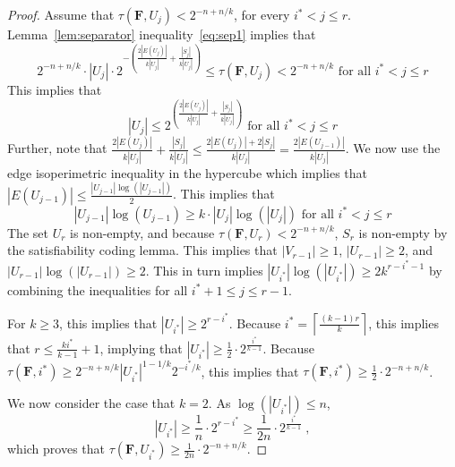 \documentclass[11pt, letterpaper]{article}
\theoremstyle{definition}
\newcommand{\f}{\mathbf{F}}
\newcommand{\ceil}[1]{{\left\lceil{#1}\right\rceil}}
\begin{document}
\begin{proof}
    \medskip\noindent
    Assume that $\tau(\f, U_j) < 2^{-n+n/k}$, for every $i^*<j \leq r$. Lemma~\ref{lem:separator} inequality~\ref{eq:sep1} implies that
    \begin{equation}
          2^{-n+n/k}\cdot |U_{j}| \cdot 2^{-\left(  \frac{2|E(U_{j})|}{k|U_{j}|}+\frac{|S_{j}|}{k|U_{j}|}\right)} \leq \tau(\f, U_j) < 2^{-n+n/k} \text{ for all } i^*<j \leq r
    \end{equation}
    This implies that
    \begin{equation}
        |U_j| \leq 2^{\left(  \frac{2|E(U_{j})|}{k|U_{j}|}+\frac{|S_{j}|}{k|U_{j}|}\right)} \text{ for all } i^*<j \leq r
    \end{equation}
    Further, note that $\frac{2|E(U_{j})|}{k|U_{j}|}+\frac{|S_{j}|}{k|U_{j}|} \leq \frac{2|E(U_{j})|+ 2|S_{j}|}{k|U_{j}|}=\frac{2|E(U_{j-1})|}{k|U_{j}|}$. We now use the edge isoperimetric inequality in the hypercube which implies that $|E(U_{j-1})| \leq  \frac{|U_{j-1}| \log(|U_{j-1}|)}{2}$. This implies that
    \begin{equation}
        |U_{j-1}| \log(U_{j-1}) \geq k \cdot |U_j| \log(|U_j|) \text{ for all } i^*<j \leq r
    \end{equation}
    The set $U_{r}$ is non-empty, and because $\tau( \f, U_{r}) < 2^{-n+n/k}$, $S_{r}$ is non-empty by the satisfiability coding lemma. This implies that $|V_{r-1}| \geq 1$, $|U_{r-1}| \geq 2$, and $|U_{r-1}|\log(|U_{r-1}|) \geq 2$. This in turn implies $|U_{i^*}| \log(|U_{i^*}|) \geq 2k^{r-i^*-1}$ by combining the inequalities for all $i^*+1\leq j \leq r-1$. 
    
    \medskip \noindent
    For $k \geq 3$, this implies that $|U_{i^*}| \geq 2^{r-i^*}$. Because $i^*=\ceil { \frac{(k-1)r}{k} }$, this implies that $r \leq \frac{k i ^*}{k-1}+1$, implying that $|U_{i^*}| \geq \frac{1}{2} \cdot 2^{\frac{i^*}{k-1}}$. Because $\tau(\f, i^*) \geq 2^{-n+n/k} |U_{i^*}|^{1-1/k}2^{-i^*/k}$, this implies that $\tau(\f, i^*) \geq \frac{1}{2}\cdot 2^{-n+n/k}$. 
    
    \medskip \noindent
    We now consider the case that $k=2$. As $\log(|U_{i^*}|) \leq n$, 
    $$ |U_{i^*}| \geq \frac{1}{n} \cdot 2^{r-i^*} \geq \frac{1}{2n} \cdot 2^{\frac{i^*}{k-1}} \; ,$$
    which proves that $\tau(\f, U_{i^*}) \geq \frac{1}{2n} \cdot 2^{-n+n/k}$.
\end{proof}
\end{document}
